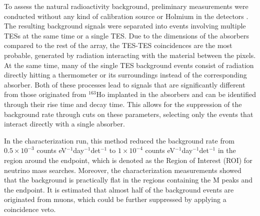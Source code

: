 To assess the natural radioactivity background, preliminary measurements were conducted without any kind of calibration
source or Holmium in the detectors \cite{borghesi2022toward}. The resulting background signals were separated into events involving multiple TESs
at the same time or a single TES. Due to the dimensions of the absorbers compared to the rest of the array, the TES-TES
coincidences are the most probable, generated by radiation interacting with the material between the pixels. At the same
time, many of the single TES background events consist of radiation directly hitting a thermometer or its surroundings
instead of the corresponding absorber. Both of these processes lead to signals that are significantly
different from those originated from $^{163}$Ho implanted in the absorbers and can be identified through their rise time
and decay time. This allows for the suppression of the background rate through cuts on these parameters, selecting only
the events that interact directly with a single absorber. 

In the characterization run, this method reduced the
background rate from $0.5 \times 10^{-3}$ counts eV$^{-1}$day$^{-1}$det$^{-1}$ to $1 \times 10^{-4}$ counts eV$^{-1}$day$^{-1}$det$^{-1}$ in the region around the endpoint, which is denoted as the Region of Interest (ROI) for neutrino
mass searches. Moreover, the characterization measurements showed that the background is practically flat in the regions
containing the M peaks and the endpoint. It is estimated that almost half of the background events are originated from muons, which could be further suppressed by applying a coincidence veto.

